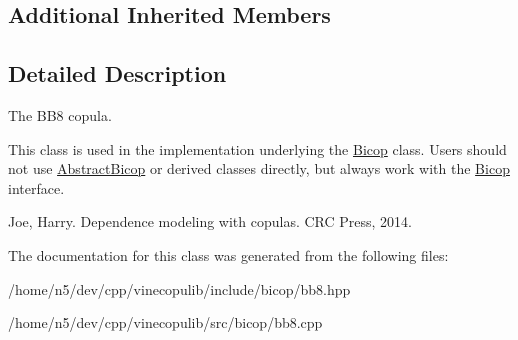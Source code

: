 \subsection*{Additional Inherited Members}


\subsection{Detailed Description}
The B\+B8 copula. 

This class is used in the implementation underlying the \hyperlink{classvinecopulib_1_1_bicop}{Bicop} class. Users should not use \hyperlink{classvinecopulib_1_1_abstract_bicop}{Abstract\+Bicop} or derived classes directly, but always work with the \hyperlink{classvinecopulib_1_1_bicop}{Bicop} interface.

Joe, Harry. Dependence modeling with copulas. C\+RC Press, 2014. 

The documentation for this class was generated from the following files\+:\begin{DoxyCompactItemize}
\item 
/home/n5/dev/cpp/vinecopulib/include/bicop/bb8.\+hpp\item 
/home/n5/dev/cpp/vinecopulib/src/bicop/bb8.\+cpp\end{DoxyCompactItemize}
